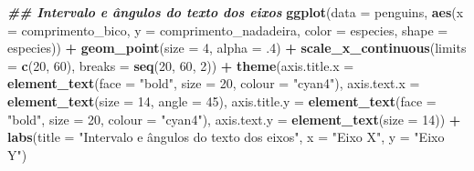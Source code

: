 \documentclass[
]{article}
\newenvironment{Shaded}{\begin{snugshade}}{\end{snugshade}}
\newcommand{\AttributeTok}[1]{\textcolor[rgb]{0.13,0.29,0.53}{#1}}
\newcommand{\DecValTok}[1]{\textcolor[rgb]{0.00,0.00,0.81}{#1}}
\newcommand{\DocumentationTok}[1]{\textcolor[rgb]{0.56,0.35,0.01}{\textbf{\textit{#1}}}}
\newcommand{\FunctionTok}[1]{\textcolor[rgb]{0.13,0.29,0.53}{\textbf{#1}}}
\newcommand{\NormalTok}[1]{#1}
\newcommand{\SpecialCharTok}[1]{\textcolor[rgb]{0.81,0.36,0.00}{\textbf{#1}}}
\newcommand{\StringTok}[1]{\textcolor[rgb]{0.31,0.60,0.02}{#1}}
\begin{document}
\begin{Shaded}
\begin{Highlighting}[]
\DocumentationTok{\#\# Intervalo e ângulos do texto dos eixos}
\FunctionTok{ggplot}\NormalTok{(}\AttributeTok{data =}\NormalTok{ penguins, }
       \FunctionTok{aes}\NormalTok{(}\AttributeTok{x =}\NormalTok{ comprimento\_bico, }\AttributeTok{y =}\NormalTok{ comprimento\_nadadeira,}
           \AttributeTok{color =}\NormalTok{ especies, }\AttributeTok{shape =}\NormalTok{ especies)) }\SpecialCharTok{+}
    \FunctionTok{geom\_point}\NormalTok{(}\AttributeTok{size =} \DecValTok{4}\NormalTok{, }\AttributeTok{alpha =}\NormalTok{ .}\DecValTok{4}\NormalTok{) }\SpecialCharTok{+}
    \FunctionTok{scale\_x\_continuous}\NormalTok{(}\AttributeTok{limits =} \FunctionTok{c}\NormalTok{(}\DecValTok{20}\NormalTok{, }\DecValTok{60}\NormalTok{), }\AttributeTok{breaks =} \FunctionTok{seq}\NormalTok{(}\DecValTok{20}\NormalTok{, }\DecValTok{60}\NormalTok{, }\DecValTok{2}\NormalTok{)) }\SpecialCharTok{+}
    \FunctionTok{theme}\NormalTok{(}\AttributeTok{axis.title.x =} \FunctionTok{element\_text}\NormalTok{(}\AttributeTok{face =} \StringTok{"bold"}\NormalTok{, }\AttributeTok{size =} \DecValTok{20}\NormalTok{, }\AttributeTok{colour =} \StringTok{"cyan4"}\NormalTok{),}
          \AttributeTok{axis.text.x =} \FunctionTok{element\_text}\NormalTok{(}\AttributeTok{size =} \DecValTok{14}\NormalTok{, }\AttributeTok{angle =} \DecValTok{45}\NormalTok{),}
          \AttributeTok{axis.title.y =} \FunctionTok{element\_text}\NormalTok{(}\AttributeTok{face =} \StringTok{"bold"}\NormalTok{, }\AttributeTok{size =} \DecValTok{20}\NormalTok{, }\AttributeTok{colour =} \StringTok{"cyan4"}\NormalTok{),}
          \AttributeTok{axis.text.y =} \FunctionTok{element\_text}\NormalTok{(}\AttributeTok{size =} \DecValTok{14}\NormalTok{)) }\SpecialCharTok{+}
    \FunctionTok{labs}\NormalTok{(}\AttributeTok{title =} \StringTok{"Intervalo e ângulos do texto dos eixos"}\NormalTok{, }\AttributeTok{x =} \StringTok{"Eixo X"}\NormalTok{, }\AttributeTok{y =} \StringTok{"Eixo Y"}\NormalTok{)}
\end{Highlighting}
\end{Shaded}
\end{document}

